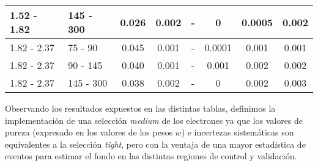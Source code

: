 \begin{table}
\begin{threeparttable}
\begin{tabular}{ l l c c c c c c }
	1.52 - 1.82 & 145 - 300 & 0.026  & 0.002 & -  	& 0  &  0.0005  &  0.002  \\

	\hline

	1.82 - 2.37 & 75 - 90 & 0.045  & 0.001 & -		& 0.0001  &  0.001 &  0.001  \\

	1.82 - 2.37 & 90 - 145 & 0.040  & 0.001 & -		& 0.001  &  0.002  &  0.002  \\

	1.82 - 2.37 & 145 - 300 & 0.038  & 0.002 & -  	& 0  &  0.002  &  0.003  \\

	\hline
	\hline

\end{tabular}
\label{ta:fftable}
\end{threeparttable}
\end{table}


Observando los resultados expuestos en las distintas tablas, definimos la implementación de una selección \textit{medium} de los electrones ya que los valores de pureza (expresado en los valores de los pesos $w$) e incertezas sistemáticas son equivalentes a la selección \textit{tight}, pero con la ventaja de una mayor estadística de eventos para estimar el fondo en las distintas regiones de control y validación.


